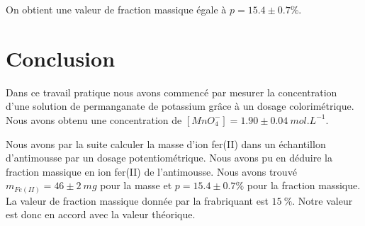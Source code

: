 \documentclass[12pt]{article}
\begin{document}
On obtient une valeur de fraction massique égale à $p=15.4 \pm 0.7 \%$.

\section*{Conclusion}
Dans ce travail pratique nous avons commencé par mesurer la concentration d'une solution de permanganate de potassium grâce à un dosage colorimétrique.
Nous avons obtenu une concentration de $[MnO_4^-]=1.90 \pm 0.04 \ mol.L^{-1}$.

Nous avons par la suite calculer la masse d'ion fer(II) dans un échantillon d'antimousse par un dosage potentiométrique.
Nous avons pu en déduire la fraction massique en ion fer(II) de l'antimousse.
Nous avons trouvé $m_{Fe(II)}= 46 \pm 2 \ mg$ pour la masse et $p=15.4 \pm 0.7 \%$ pour la fraction massique.
La valeur de fraction massique donnée par la frabriquant est $15 \ \%$. 
Notre valeur est donc en accord avec la valeur théorique.
\end{document}
